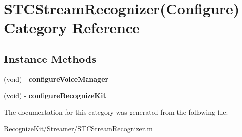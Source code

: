 \hypertarget{category_s_t_c_stream_recognizer_07_configure_08}{}\section{S\+T\+C\+Stream\+Recognizer(Configure) Category Reference}
\label{category_s_t_c_stream_recognizer_07_configure_08}
\subsection*{Instance Methods}
\begin{DoxyCompactItemize}
\item 
\hypertarget{category_s_t_c_stream_recognizer_07_configure_08_afa7c6800ec416187b3aeec90ba440fe7}{}\label{category_s_t_c_stream_recognizer_07_configure_08_afa7c6800ec416187b3aeec90ba440fe7} 
(void) -\/ {\bfseries configure\+Voice\+Manager}
\item 
\hypertarget{category_s_t_c_stream_recognizer_07_configure_08_a2edbc943b87e9dac3f7c172bec8ab817}{}\label{category_s_t_c_stream_recognizer_07_configure_08_a2edbc943b87e9dac3f7c172bec8ab817} 
(void) -\/ {\bfseries configure\+Recognize\+Kit}
\end{DoxyCompactItemize}


The documentation for this category was generated from the following file\+:\begin{DoxyCompactItemize}
\item 
Recognize\+Kit/\+Streamer/S\+T\+C\+Stream\+Recognizer.\+m\end{DoxyCompactItemize}
